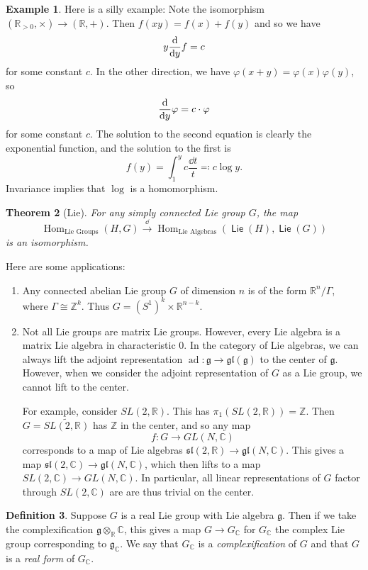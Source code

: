 \documentclass[leqno, openany]{memoir}
\newtheorem{thm}{Theorem}[section]
\theoremstyle{definition}
\newtheorem{defn}[thm]{Definition}
\newtheorem{exm}[thm]{Example}
\theoremstyle{remark}
\theoremstyle{plain}
\theoremstyle{definition}
\theoremstyle{remark}
\newcommand{\R}{\mathbb{R}}
\newcommand{\C}{\mathbb{C}}
\newcommand{\Z}{\mathbb{Z}}
\newcommand{\mf}[1]{\mathfrak{#1}}
\newcommand{\wt}[1]{\widetilde{#1}}
\DeclareMathOperator{\Hom}{Hom}
\DeclareMathOperator{\ad}{ad}
\DeclareMathOperator{\Lie}{\mathsf{Lie}}
\begin{document}
\begin{exm}
    Here is a silly example: Note the isomorphism $(\R_{>0}, \times) \to (\R, +)$. Then $f(xy) = f(x) + f(y)$ and so we have
    \[ y \dv{y} f = c \]
    for some constant $c$. In the other direction, we have $\varphi(x+y) = \varphi(x) \varphi(y)$, so 
    \[ \dv{y} \varphi = c \cdot \varphi \]
    for some constant $c$. The solution to the second equation is clearly the exponential function, and the solution to the first is
    \[ f(y) = \int_1^y c \frac{\dd{t}}{t} \eqqcolon c \log y. \]
    Invariance implies that $\log$ is a homomorphism.
\end{exm}

\begin{thm}[Lie]
    For any simply connected Lie group $G$, the map
    \[ \Hom_{\text{Lie Groups}}(H,G) \xrightarrow{\dd} \Hom_{\text{Lie Algebras}}(\Lie(H), \Lie(G)) \]
    is an isomorphism.
\end{thm}

Here are some applications:
\begin{enumerate}
    \item Any connected abelian Lie group $G$ of dimension $n$ is of the form $\R^n / \Gamma$, where $\Gamma \cong \Z^k$. Thus $G = (S^1)^k \times \R^{n-k}$.
    \item Not all Lie groups are matrix Lie groups. However, every Lie algebra is a matrix Lie algebra in characteristic $0$. In the category of Lie algebras, we can always lift the adjoint representation $\ad \colon \mf{g} \to \mf{gl}(\mf{g})$ to the center of $\mf{g}$. However, when we consider the adjoint representation of $G$ as a Lie group, we cannot lift to the center.

        For example, consider $SL(2, \R)$. This has $\pi_1(SL(2, \R)) = \Z$. Then $G = \wt{SL(2, \R)}$ has $\Z$ in the center, and so any map
        \[ f \colon G \to GL(N, \C) \]
        corresponds to a map of Lie algebras $\mf{sl}(2, \R) \to \mf{gl}(N, \C)$. This gives a map $\mf{sl}(2, \C) \to \mf{gl}(N, \C)$, which then lifts to a map $SL(2, \C) \to GL(N, \C)$. In particular, all linear representations of $G$ factor through $SL(2, \C)$ are are thus trivial on the center.
\end{enumerate}

\begin{defn}
    Suppose $G$ is a real Lie group with Lie algebra $\mf{g}$. Then if we take the complexification $\mf{g} \otimes_{\R} \C$, this gives a map $G \to G_{\C}$ for $G_{\C}$ the complex Lie group corresponding to $\mf{g}_{\C}$. We say that $G_{\C}$ is a \textit{complexification} of $G$ and that $G$ is a \textit{real form} of $G_{\C}$.  
\end{defn}
\end{document}
